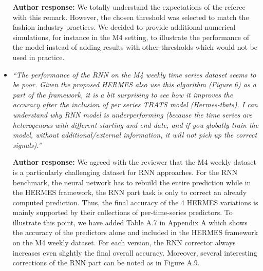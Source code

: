 \documentclass[11pt]{article}
\begin{document}
\begin{itemize}
\textbf{Author response:} We totally understand the expectations of the referee with this remark. However, the chosen threshold was selected to match the fashion industry practices. We decided to provide additional numerical simulations, for instance in the M4 setting, to illustrate the performance of the model instead of adding results with other thresholds which would not be used in practice. 

\item {\em ``The performance of the RNN on the M4 weekly time series dataset seems to be poor. Given the proposed HERMES also use this algorithm (Figure 6) as a part of the framework, it is a bit surprising to see how it improves the accuracy after the inclusion of per series TBATS model (Hermes-tbats). I can understand why RNN model is underperforming (because the time series are heterogenous with different starting and end date, and if you globally train the model, without additional/external information, it will not pick up the correct signals).''} \medskip

\textbf{Author response:} We agreed with the reviewer that the M4 weekly dataset is a particularly challenging dataset for RNN approaches. For the RNN benchmark, the neural network has to rebuild the entire prediction while in the HERMES framework, the RNN part task is only to correct an already computed prediction. Thus, the final accuracy of the 4 HERMES variations is mainly supported by their collections of  per-time-series predictors. To illustrate this point, we have added Table A.7 in Appendix A which shows the accuracy of the predictors alone and included in the HERMES framework on the M4 weekly dataset. For each version, the RNN corrector always increases even slightly the final overall accuracy. Moreover, several interesting corrections of the RNN part can be noted as in Figure A.9.
 
\end{itemize}
\end{document}

